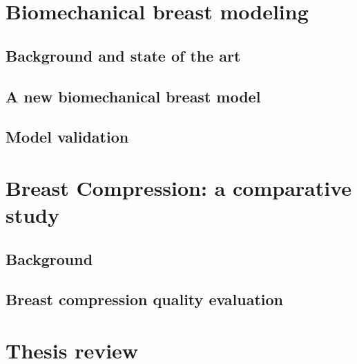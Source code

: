 \documentclass[a4paper,12pt,twoside]{report}
\begin{document}
\clearemptydoublepage
\part{Biomechanical breast modeling}\label{part:bioMecaModels}
\chapter{Background and state of the art}\label{chapter:bioMecaModelsBackground}


\chapter{A new biomechanical breast model}\label{chapter:myBioMecaModel}

\chapter{Model validation}\label{chapter:modelvalidation}


\clearemptydoublepage
\part{Breast Compression: a comparative study}\label{part:breastcompressionDM}
\chapter{ Background }\label{chapter:compression:introduction}


\chapter{Breast compression quality evaluation}\label{chapter:compressionfem}


\clearemptydoublepage
\part{Thesis review}\label{part:thesisreview}



%
\end{document}
